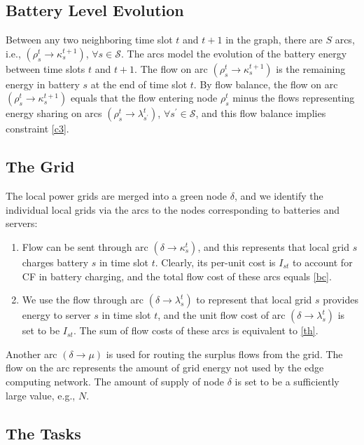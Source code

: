 \documentclass[conference, 10pt, ﬁnal, letterpaper, twocolumn]{IEEEtran}
\begin{document}
\subsection{Battery Level Evolution}
Between any two neighboring time slot $t$ and $t+1$ in the graph, there are $S$ arcs, i.e., $(\rho^{t}_{s}\rightarrow\kappa^{t+1}_{s})$, $\forall s\in \mathcal{S}$. The arcs model the evolution of the battery energy between time slots $t$ and $t+1$. The flow on arc $(\rho^{t}_{s}\rightarrow \kappa^{t+1}_{s})$ is the remaining energy in battery $s$ at the end of time slot $t$. By flow balance, the flow on arc $(\rho^{t}_{s}\rightarrow \kappa^{t+1}_{s})$ equals that the flow entering node $\rho^{t}_{s}$ minus the flows representing energy sharing on arcs $(\rho^{t}_{s}\rightarrow \lambda^{t}_{s^\prime})$, $\forall s^\prime \in \mathcal{S}$, and this flow balance implies constraint \eqref{c3}.

\subsection{The Grid}

The local power grids are merged into a green node $\delta$, and we identify the individual local grids via the arcs to the nodes corresponding to batteries and servers:
\begin{enumerate}
    \item Flow can be sent through arc $(\delta \rightarrow\kappa^{t}_{s})$, and this represents that local grid $s$ charges battery $s$ in time slot $t$. Clearly, its per-unit cost is $I_{st}$ to account for CF in battery charging, and the total flow cost of these arcs equals \eqref{bc}.
    \item We use the flow through arc $(\delta \rightarrow \lambda^{t}_{s})$ to represent that local grid $s$ provides energy to server $s$ in time slot $t$, and the unit flow cost of arc $(\delta \rightarrow \lambda^{t}_{s})$ is set to be $I_{st}$. The sum of flow costs of these arcs is equivalent to \eqref{th}.
\end{enumerate}
Another arc $(\delta \rightarrow \mu)$ is used for routing the surplus flows from the grid. The flow on the arc represents the amount of grid energy not used by the edge computing network. The amount of supply of node $\delta$ is set to be a sufficiently large value, e.g., $N$. 

\subsection{The Tasks} \label{sub-D}
\end{document}
